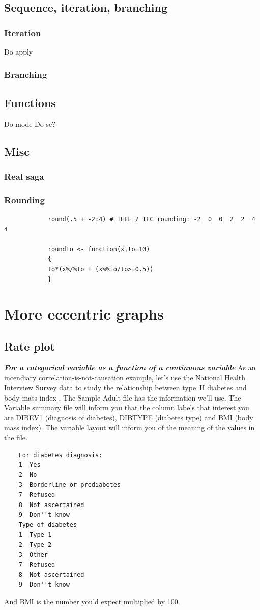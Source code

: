 \documentclass{report}
\newcommand{\notefor}[1]{\hfill\textbf{\textit{#1}}}
\begin{document}
	\section{Sequence, iteration, branching}
		\subsection{Iteration}\label{subsec:iteration}
		Do apply
		
		\subsection{Branching}\label{subsec:branching}
	\section{Functions}\label{sec:functions}
	Do mode
	Do se?
	
	\section{Misc}
		\subsection{Real saga}
		\subsection{Rounding}
		
		\begin{verbatim}
			round(.5 + -2:4) # IEEE / IEC rounding: -2  0  0  2  2  4  4
			
			roundTo <- function(x,to=10)
			{
			to*(x%/%to + (x%%to/to>=0.5))
			}
		\end{verbatim}
		
		
	
\chapter{More eccentric graphs}
	\section{Rate plot}\label{sec:cdplot}
	\notefor{For a categorical variable as a function of a continuous variable}
	As an incendiary correlation-is-not-causation example, let's use the National Health Interview Survey data to study the relationship between type~II diabetes and body mass index \cite{nhis}. The Sample Adult file has the information we'll use. The Variable summary file will inform you that the column labels that interest you are DIBEV1 (diagnosis of diabetes), DIBTYPE (diabetes type) and BMI (body mass index). The variable layout will inform you of the meaning of the values in the file.
	\begin{verbatim}
	For diabetes diagnosis: 
	1  Yes
	2  No
	3  Borderline or prediabetes
	7  Refused
	8  Not ascertained
	9  Don''t know 
	Type of diabetes
	1  Type 1
	2  Type 2
	3  Other
	7  Refused
	8  Not ascertained
	9  Don''t know 
	\end{verbatim}
	And BMI is the number you'd expect multiplied by 100.
	
\end{document}
